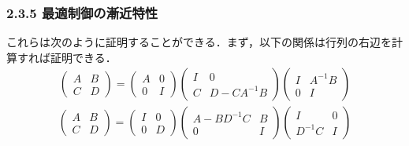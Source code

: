 \begin{frame}[t]
\frametitle{2.3.5 最適制御の漸近特性}
これらは次のように証明することができる．まず，以下の関係は行列の右辺を計算すれば証明できる．
\begin{align}
	\left(\begin{array}{cc}
		A & B \\
		C & D
	\end{array}\right)
	=
	\left(\begin{array}{cc}
		A & 0 \\
		0 & I
	\end{array}\right)
	\left(\begin{array}{cc}
		I & 0 \\
		C & D-C A^{-1}B
	\end{array}\right)
	\left(\begin{array}{cc}
		I & A^{-1}B \\
		0 & I
	\end{array}\right)
\nonumber
\end{align}
\begin{align}
	\left(\begin{array}{cc}
		A & B \\
		C & D
	\end{array}\right)
	=
	\left(\begin{array}{cc}
		I & 0 \\
		0 & D
	\end{array}\right)
	\left(\begin{array}{cc}
		A - B D^{-1} C & B \\
		0              & I
	\end{array}\right)
	\left(\begin{array}{cc}
		I        & 0 \\
		D^{-1} C & I
	\end{array}\right)
\nonumber
\end{align}
\end{frame}

